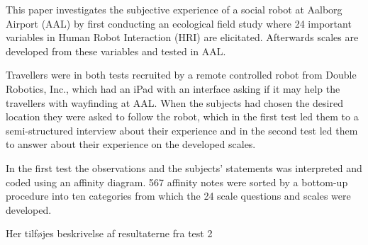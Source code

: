 \label{Abstract}
This paper investigates the subjective experience of a social robot at Aalborg Airport (AAL) by first conducting an ecological field study where 24 important variables in Human Robot Interaction (HRI) are elicitated. Afterwards scales are developed from these variables and tested in AAL. 

Travellers were in both tests recruited by a remote controlled robot from Double Robotics, Inc., which had an iPad with an interface asking if it may help the travellers with wayfinding at AAL. When the subjects had chosen the desired location they were asked to follow the robot, which in the first test led them to a semi-structured interview about their experience and in the second test led them to answer about their experience on the developed scales. 

In the first test the observations and the subjects' statements was interpreted and coded using an affinity diagram. 567 affinity notes were sorted by a bottom-up procedure into ten categories from which the 24 scale questions and scales were developed. 

{\color{red} Her tilføjes beskrivelse af resultaterne fra test 2}

%
%



